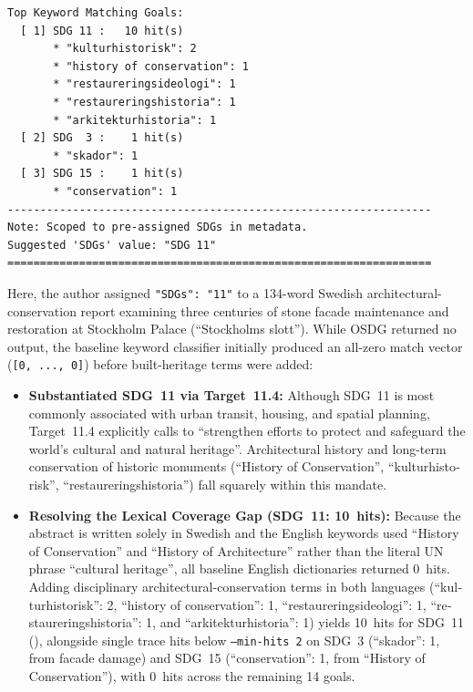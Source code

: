 \begin{casestudySection}
\begin{lstlisting}
Top Keyword Matching Goals:
  [ 1] SDG 11 :   10 hit(s)
       * "kulturhistorisk": 2
       * "history of conservation": 1
       * "restaureringsideologi": 1
       * "restaureringshistoria": 1
       * "arkitekturhistoria": 1
  [ 2] SDG  3 :    1 hit(s)
       * "skador": 1
  [ 3] SDG 15 :    1 hit(s)
       * "conservation": 1
-----------------------------------------------------------------
Note: Scoped to pre-assigned SDGs in metadata.
Suggested 'SDGs' value: "SDG 11"
=================================================================
\end{lstlisting}

Here, the author assigned \texttt{"SDGs": "11"} to a \num{134}-word Swedish architectural-conservation report examining three centuries of stone facade maintenance and restoration at Stockholm Palace (\enquote{\foreignlanguage{swedish}{Stockholms slott}}). While OSDG returned no output, the baseline keyword classifier initially produced an all-zero match vector (\texttt{[0, ..., 0]}) before built-heritage terms were added:
\begin{itemize}
    \item \textbf{Substantiated \gls{SDG}~11 via Target~11.4:} Although \gls{SDG}~11 is most commonly associated with urban transit, housing, and spatial planning, Target~11.4 explicitly calls to \enquote{strengthen efforts to protect and safeguard the world's cultural and natural heritage}. Architectural history and long-term conservation of historic monuments (\enquote{History of Conservation}, \enquote{\foreignlanguage{swedish}{kulturhistorisk}}, \enquote{\foreignlanguage{swedish}{restaureringshistoria}}) fall squarely within this mandate.
    
    \item \textbf{Resolving the Lexical Coverage Gap (\gls{SDG}~11: \num{10}~hits):} Because the abstract is written solely in Swedish and the English keywords used \enquote{History of Conservation} and \enquote{History of Architecture} rather than the literal \gls{UN} phrase \enquote{cultural heritage}, all baseline English dictionaries returned \num{0}~hits. Adding disciplinary architectural-conservation terms in both languages (\enquote{\foreignlanguage{swedish}{kulturhistorisk}}: 2, \enquote{history of conservation}: 1, \enquote{\foreignlanguage{swedish}{restaureringsideologi}}: 1, \enquote{\foreignlanguage{swedish}{restaureringshistoria}}: 1, and \enquote{\foreignlanguage{swedish}{arkitekturhistoria}}: 1) yields \num{10}~hits for \gls{SDG}~11 (), alongside single trace hits below \texttt{--min-hits 2} on \gls{SDG}~3 (\enquote{\foreignlanguage{swedish}{skador}}: 1, from facade damage) and \gls{SDG}~15 (\enquote{conservation}: 1, from \enquote{History of Conservation}), with \num{0}~hits across the remaining \num{14} goals.
\end{itemize}
\end{casestudySection}

